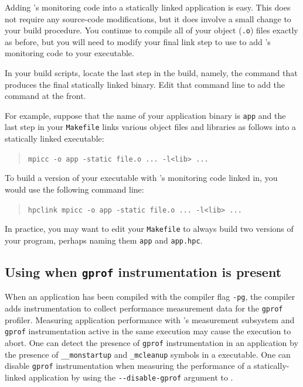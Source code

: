 \documentclass[11pt,twoside,letterpaper]{report}
\begin{document}
Adding \HPCToolkit{}'s monitoring code into a statically linked application is easy.
This does not require any source-code modifications, but it does involve a small change to your build procedure.
You continue to compile all of your object (\texttt{.o}) files exactly as before, but you will need to modify your final link step to use \hpclink{} to add \HPCToolkit{}'s monitoring code to your executable.

In your build scripts, locate the last step in the build, namely, the command that produces the final statically linked binary.
Edit that command line to add the \hpclink{} command at the front.

For example, suppose that the name of your application binary is \texttt{app} and the last step in
your \texttt{Makefile} links various object files and libraries as
follows into a statically linked executable:
\begin{quote}
  \verb|mpicc -o app -static file.o ... -l<lib> ...|
\end{quote}
To build a version of your executable with \HPCToolkit's monitoring code linked in, you would use the following command line:
\begin{quote}
  \verb|hpclink mpicc -o app -static file.o ... -l<lib> ...|
\end{quote}

In practice, you may want to edit your \texttt{Makefile} to always build two versions of your program, perhaps naming them \texttt{app} and \texttt{app.hpc}.


\subsection{Using \hpclink{} when {\tt gprof} instrumentation is present}

When an application has been compiled with the compiler flag \verb|-pg|,
the compiler adds instrumentation to collect performance measurement data for
the \verb|gprof| profiler. Measuring application performance with
\HPCToolkit{}'s measurement subsystem and \verb|gprof| instrumentation
active in the same execution may cause the execution
to abort. One can detect the presence of \verb|gprof| instrumentation in an
application by the presence of \verb|__monstartup| and \verb|_mcleanup| symbols
in a executable.
One can disable \verb|gprof| instrumentation when measuring the performance of
a statically-linked application by using the \verb|--disable-gprof|
argument to \hpclink{}.
\end{document}
